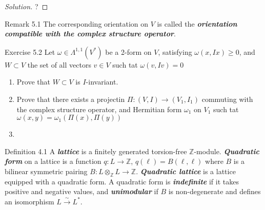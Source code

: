 \begin{proof}[Solution]\leavevmode
	?
\end{proof}

\begin{idea6}{Remark 5.1}\leavevmode
	The corresponding orientation on $V$ is called the \textit{\textbf{orientation compatible with the complex structure operator}}.
\end{idea6}

\begin{idea4}{Exercise 5.2}\leavevmode
	Let $\omega\in\Lambda^{1,1}(V^*)$ be a 2-form on $V$, satisfying $\omega(x,Ix)\geq 0$, and $W\subset V$ the set of all vectors $v\in V$ such tat $\omega(v,Iv)=0$ 
	\begin{enumerate}
		\item Prove that $W\subset V$ is $I$-invariant.
		\item Prove that there exists a projectin $\Pi:(V,I)\to (V_1,I_1)$ commuting with the complex structure operator, and Hermitian form $\omega_1$ on $V_1$ such tat $\omega(x,y)=\omega_1(\Pi(x),\Pi(y))$
	
		\item 
	\end{enumerate}
\end{idea4}

\begin{idea5}{Definition 4.1}\leavevmode
	A \textit{\textbf{lattice}} is a finitely generated torsion-free $\mathbb{Z}$-module. \textit{\textbf{Quadratic form}} on a lattice is a function $q:L\to \mathbb{Z}$, $q(\ell)=B(\ell,\ell)$ where $B$ is a bilinear symmetric pairing $B:L\otimes_\mathbb{Z}L\longrightarrow \mathbb{Z}$. \textit{\textbf{Quadratic lattice}} is a lattice equipped with a quadratic form. A quadratic form is \textit{\textbf{indefinite}} if it takes positive and negative values, and \textit{\textbf{unimodular}} if $B$ is non-degenerate and defines an isomorphism $L\xrightarrow{\sim}L^*$.
\end{idea5}
\iffalse
\begin{idea1}{Question}\leavevmode
	With respect to the definition of unimodular, are non-degeneracy and isomorphism $L\cong L^*$ two \textit{independant} conditions? Because I thought the definition of non-degenerate form (at least for vector spaces) is that interior multiplication is an isomorphism $V\cong V^*$.
\end{idea1}\fi


